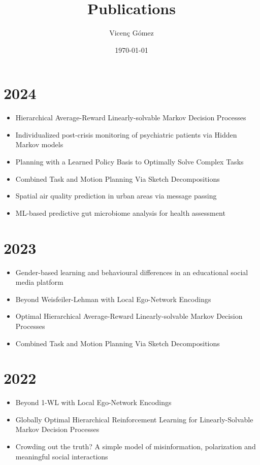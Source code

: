 \documentclass{article}
\title{Publications}
\author{Vicen\c{c} G\'omez}
\date{\today}
\begin{document}
\maketitle

\section*{2024}
\begin{itemize}
\item Hierarchical Average-Reward Linearly-solvable Markov Decision Processes~\cite{infante-ecai-2024}
\item Individualized post-crisis monitoring of psychiatric patients via Hidden Markov models~\cite{garriga2024}
\item Planning with a Learned Policy Basis to Optimally Solve Complex Tasks~\cite{KuricInfante_ICAPS24}
\item Combined Task and Motion Planning Via Sketch Decompositions~\cite{dalmau-ICAPS24}
\item Spatial air quality prediction in urban areas via message passing~\cite{CALO2024108191}
\item ML-based predictive gut microbiome analysis for health assessment~\cite{SORRIBES20241452}
\end{itemize}


\section*{2023}
\begin{itemize}
\item Gender-based learning and behavioural differences in an educational social media platform~\cite{theophilou2023}
\item Beyond Weisfeiler-Lehman with Local Ego-Network Encodings~\cite{make5040063}
\item Optimal Hierarchical Average-Reward Linearly-solvable Markov Decision Processes~\cite{molina2023optimal}
\item Combined Task and Motion Planning Via Sketch Decompositions~\cite{dalmau-planrob-2023}
\end{itemize}

\section*{2022}

\begin{itemize}
\item Beyond 1-WL with Local Ego-Network Encodings~\cite{alvarez-gonzalez2022beyond}
\item Globally Optimal Hierarchical Reinforcement Learning for Linearly-Solvable Markov Decision Processes~\cite{infante2022globally}
\item Crowding out the truth? A simple model of misinformation, polarization and meaningful social interactions~\cite{fabrizio-ic2s2-2022}
\end{itemize}
\end{document}
